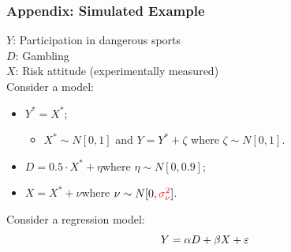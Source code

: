 \begin{frame}[noframenumbering]
\frametitle{Appendix: Simulated Example}\label{app:sim_control1}
$Y$: Participation in dangerous sports\\
$D$: Gambling\\
$X$: Risk attitude (experimentally measured)\\
\vspace{3mm}
Consider a model:
    \begin{itemize}
        \item $Y^{*}=X^{*}$;
        \begin{itemize}
            \item $X^{*}\sim N[0,1]$ and $Y=Y^{*} + \zeta$ where $\zeta \sim N[0,1]$.
        \end{itemize}
        \item $D = 0.5 \cdot X^{*} + \eta$\quad where $\eta \sim N [0,0.9]$;
        \item $X = X^{*} + \nu$\quad where $\nu \sim N[0,{\color{red}\sigma^{2}_{\nu}}]$.
    \end{itemize}
    \vspace{3mm}
    Consider a regression model:
    \[
    Y = \alpha D + \beta X + \varepsilon
    \]
    \hyperlink{slide:NV}{}
\end{frame}

